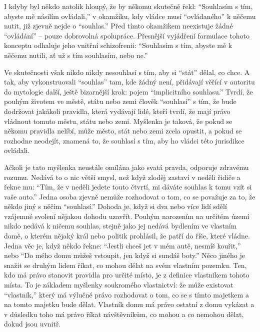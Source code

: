 \documentclass{book}
\begin{document}
I kdyby byl někdo natolik hloupý, že by někomu skutečně řekl: \enquote{Souhlasím s tím, abyste mě násilím ovládali,} v okamžiku, kdy vládce musí \enquote{ovládaného} k něčemu nutit, již zjevně nejde o \enquote{souhlas.} Před tímto okamžikem neexistuje žádné \enquote{ovládání} -- pouze dobrovolná spolupráce. Přesnější vyjádření formulace tohoto konceptu odhaluje jeho vnitřní schizofrenii: \enquote{Souhlasím s tím, abyste mě k něčemu nutili, ať už s tím souhlasím, nebo ne.}

Ve skutečnosti však nikdo nikdy nesouhlasí s tím, aby si \enquote{stát} dělal, co chce. A tak, aby vykonstruovali \enquote{souhlas} tam, kde žádný není, přidávají věřící v autoritu do mytologie další, ještě bizarnější krok: pojem \enquote{implicitního souhlasu.} Tvrdí, že pouhým životem ve městě, státu nebo zemi člověk \enquote{souhlasí} s tím, že bude dodržovat jakákoli pravidla, která vydávají lidé, kteří tvrdí, že mají právo vládnout tomuto městu, státu nebo zemi. Myšlenka je taková, že pokud se někomu pravidla nelíbí, může město, stát nebo zemi zcela opustit, a pokud se rozhodne neodejít, znamená to, že souhlasí s tím, aby ho vládci této jurisdikce ovládali.

Ačkoli je tato myšlenka neustále omílána jako svatá pravda, odporuje zdravému rozumu. Nedává to o nic větší smysl, než když zloděj zastaví v neděli řidiče a řekne mu: \enquote{Tím, že v neděli jedete touto čtvrtí, mi dáváte souhlas k tomu vzít si vaše auto.} Jedna osoba zjevně nemůže rozhodovat o tom, co se považuje za to, že někdo jiný s něčím \enquote{souhlasí.} Dohoda je, když si dva nebo více lidí sdělí vzájemné svolení nějakou dohodu uzavřít. Pouhým narozením na určitém území nikdo nedává k ničemu souhlas, stejně jako jej nedává bydlením ve vlastním domě, o kterém nějaký král nebo politik prohlásil, že patří do říše, které vládne. Jedna věc je, když někdo řekne: \enquote{Jestli chceš jet v mém autě, nesmíš kouřit,} nebo \enquote{Do mého domu můžeš vstoupit, jen když si sundáš boty.} Něco jiného je snažit se druhým lidem říkat, co mohou dělat na svém vlastním pozemku. Ten, kdo má právo stanovit pravidla pro určité místo, je z definice vlastníkem tohoto místa. To je základem myšlenky soukromého vlastnictví: že může existovat \enquote{vlastník,} který má výlučné právo rozhodovat o tom, co se s tímto majetkem a na tomto majetku bude dělat. Vlastník domu má právo ostatní z domu vykázat a v důsledku toho má právo říkat návštěvníkům, co mohou a co nemohou dělat, dokud jsou uvnitř.
\end{document}
